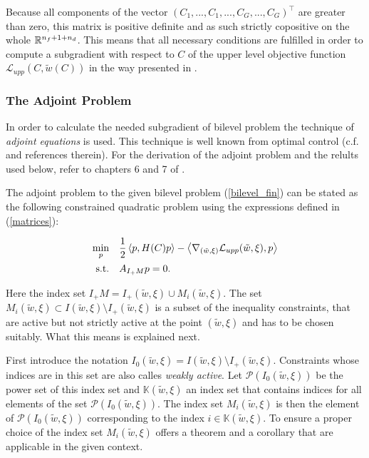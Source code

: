 Because all components of the vector \((C_1,...,C_1,...,C_G,...,C_G)^{\top}\) are greater than zero, this matrix is positive definite and as such strictly copositive on the whole \(\mathbb{R}^{n_f+1+n_d}\).
This means that all necessary conditions are fulfilled in order to compute a subgradient with respect to \(C\) of the upper level objective function \(\mathcal{L}_{upp}(C,\tilde{w}(C))\) in the way presented in \cite{Outrata1998}.

\subsubsection{The Adjoint Problem}

In order to calculate the needed subgradient of bilevel problem the technique of \emph{adjoint equations} is used. This technique is well known from optimal control (c.f. \cite[p. 126]{Outrata1998} and references therein). For the derivation of the adjoint problem and the relults used below, refer to chapters 6 and 7 of \cite{Outrata1998}. 

The adjoint problem to the given bilevel problem (\ref{bilevel_fin}) can be stated as the following constrained quadratic problem using the expressions defined in (\ref{matrices}):

\begin{equation}
\begin{split}
	\min_{p} & \quad\frac{1}{2}\left\langle p,H(C)p\right\rangle - \left\langle \nabla_{(\tilde{w},\xi)} \mathcal{L}_{upp}(\tilde{w},\xi),p\right\rangle \\
	\text{s.t.} & \quad A_{I_+M}p = 0.
\end{split}
\label{adj_prob}
\end{equation}

Here the index set \(I_+M = I_+(\tilde{w},\xi) \cup M_i(\tilde{w},\xi)\).
The set \(M_i(\tilde{w},\xi) \subset I(\tilde{w},\xi) \setminus I_+(\tilde{w},\xi)\) is a subset of the inequality constraints, that are active but not strictly active at the point \((\tilde{w},\xi)\) and has to be chosen suitably.
What this means is explained next.

First introduce the notation \(I_0(\tilde{w},\xi) = I(\tilde{w},\xi) \setminus I_+(\tilde{w},\xi)\). Constraints whose indices are in this set are also calles \emph{weakly active}. Let \(\mathcal{P}(I_0(\tilde{w},\xi))\) be the power set of this index set and \(\mathbb{K}(\tilde{w},\xi)\) an index set that contains indices for all elements of the set \(\mathcal{P}(I_0(\tilde{w},\xi))\). The index set \(M_i(\tilde{w},\xi)\) is then the element of \(\mathcal{P}(I_0(\tilde{w},\xi))\) corresponding to the index \(i \in \mathbb{K}(\tilde{w},\xi)\).
To ensure a proper choice of the index set \(M_i(\tilde{w},\xi)\) \cite{Outrata1998} offers a theorem and a corollary that are applicable in the given context.

